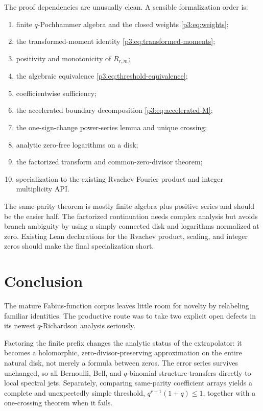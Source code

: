 \documentclass[11pt]{article}
\numberwithin{equation}{section}
\theoremstyle{definition}
\theoremstyle{remark}
\begin{document}
The proof dependencies are unusually clean.  A sensible formalization order is:
\begin{enumerate}
\item finite $q$-Pochhammer algebra and the closed weights \eqref{p3:eq:weights};
\item the transformed-moment identity \eqref{p3:eq:transformed-moments};
\item positivity and monotonicity of $R_{r,m}$;
\item the algebraic equivalence \eqref{p3:eq:threshold-equivalence};
\item coefficientwise sufficiency;
\item the accelerated boundary decomposition \eqref{p3:eq:accelerated-M};
\item the one-sign-change power-series lemma and unique crossing;
\item analytic zero-free logarithms on a disk;
\item the factorized transform and common-zero-divisor theorem;
\item specialization to the existing Rvachev Fourier product and integer multiplicity API.
\end{enumerate}

The same-parity theorem is mostly finite algebra plus positive series and should be the easier
half.  The factorized continuation needs complex analysis but avoids branch ambiguity by
using a simply connected disk and logarithms normalized at zero.  Existing Lean declarations
for the Rvachev product, scaling, and integer zeros should make the final specialization
short.

\section{Conclusion}

The mature Fabius-function corpus leaves little room for novelty by relabeling familiar
identities.  The productive route was to take two explicit open defects in its newest
$q$-Richardson analysis seriously.

Factoring the finite prefix changes the analytic status of the extrapolator: it becomes a
holomorphic, zero-divisor-preserving approximation on the entire natural disk, not merely a
formula between zeros.  The error series survives unchanged, so all Bernoulli, Bell, and
$q$-binomial structure transfers directly to local spectral jets.  Separately, comparing
same-parity coefficient arrays yields a complete and unexpectedly simple threshold,
$q^{r+1}(1+q)\le1$, together with a one-crossing theorem when it fails.
\end{document}
